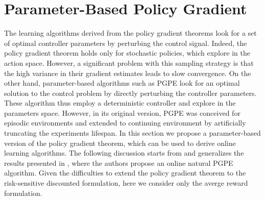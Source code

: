 \section{Parameter-Based Policy Gradient}
The learning algorithms derived from the policy gradient theorems look for a set of optimal controller parameters by perturbing the control signal. Indeed, the policy gradient theorem holds only for stochastic policies, which explore in the action space.
However, a significant problem with this sampling strategy is that the high variance in their gradient estimates leads to slow convergence. On the other hand, parameter-based algorithms such as PGPE look for an optimal solution to the control problem by directly perturbing the controller parameters. These algorithm thus employ a deterministic controller and explore in the parameters space. However, in its original version, PGPE was conceived for episodic environments and extended to continuing environment by artificially truncating the experiments lifespan. In this section we propose a parameter-based version of the policy gradient theorem, which can be used to derive online learning algorithms. The following discussion starts from and generalizes the results presented in \cite{miyamae2010natural}, where the authors propose an online natural PGPE algorithm. Given the difficulties to extend the policy gradient theorem to the risk-sensitive discounted formulation, here we consider only the averge reward formulation. 

